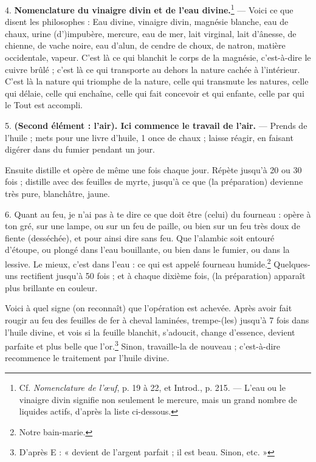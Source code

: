 \documentclass[a4paper, 11pt, oneside, polutonikogreek, french]{article}
\begin{document}
4. \textbf{Nomenclature du vinaigre divin et de l'eau divine.}\footnote{Cf. \emph{Nomenclature de l'œuf}, p. 19 à 22, et Introd., p. 215. --- L'eau ou le vinaigre divin signifie non seulement le mercure, mais un grand nombre de liquides actifs, d'après la liste ci-dessous.} --- Voici ce que disent les philosophes : Eau divine, vinaigre divin, magnésie blanche, eau de chaux, urine (d')impubère, mercure, eau de mer, lait virginal, lait d'ânesse, de chienne, de vache noire, eau d'alun, de cendre de choux, de natron, matière occidentale, vapeur. C'est là ce qui blanchit le corps de la magnésie, c'est-à-dire le cuivre brûlé ; c'est là ce qui transporte au dehors la nature cachée à l'intérieur. C'est là la nature qui triomphe de la nature, celle qui transmute les natures, celle qui délaie, celle qui enchaîne, celle qui fait concevoir et qui enfante, celle par qui le Tout est accompli.

5. \textbf{(Second élément : l'air). Ici commence le travail de l'air.} --- Prends de l'huile ; mets pour une livre d'huile, 1 once de chaux ; laisse réagir, en faisant digérer dans du fumier pendant un jour.

Ensuite distille et opère de même une fois chaque jour. Répète jusqu'à 20 ou 30 fois ; distille avec des feuilles de myrte, jusqu'à ce que (la préparation) devienne très pure, blanchâtre, jaune.

6. Quant au feu, je n'ai pas à te dire ce que doit être (celui) du fourneau : opère à ton gré, sur une lampe, ou sur un feu de paille, ou bien sur un feu très doux de fiente (desséchée), et pour ainsi dire sans feu. Que l'alambic soit entouré d'étoupe, ou plongé dans l'eau bouillante, ou bien dans le fumier, ou dans la lessive. Le mieux, c'est dans l'eau : ce qui est appelé fourneau humide.\footnote{Notre bain-marie.} Quelques-uns rectifient jusqu'à 50 fois ; et à chaque dixième fois, (la préparation) apparaît plus brillante en couleur.

Voici à quel signe (on reconnaît) que l'opération est achevée. Après avoir fait rougir au feu des feuilles de fer à cheval laminées, trempe-(les) jusqu'à 7 fois dans l'huile divine, et vois si la feuille blanchit, s'adoucit, change d'essence, devient parfaite et plus belle que l'or.\footnote{D'après E : « devient de l'argent parfait ; il est beau. Sinon, etc. »} Sinon, travaille-la de nouveau ; c'est-à-dire recommence le traitement par l'huile divine.
\end{document}
